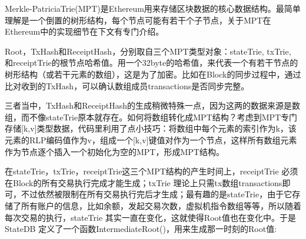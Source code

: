 \documentclass[UTF8]{ctexart}
\begin{document}
Merkle-PatriciaTrie(MPT)是Ethereum用来存储区块数据的核心数据结构。最简单理解是一个倒置的树形结构，每个节点可能有若干个子节点，关于MPT在Ethereum中的实现细节在下文有专门介绍。

Root，TxHash和ReceiptHash，分别取自三个MPT类型对象：stateTrie, txTrie, 和receiptTrie的根节点哈希值。用一个32byte的哈希值，来代表一个有若干节点的树形结构（或若干元素的数组），这是为了加密。比如在Block的同步过程中，通过比对收到的TxHash，可以确认数组成员transactions是否同步完整。

三者当中，TxHash和ReceiptHash的生成稍微特殊一点，因为这两的数据来源是数组，而不像stateTrie原本就存在。如何将数组转化成MPT结构？考虑到MPT专门存储[k,v]类型数据，代码里利用了点小技巧：将数组中每个元素的索引作为k，该元素的RLP编码值作为v，组成一个[k,v]键值对作为一个节点，这样所有数组元素作为节点逐个插入一个初始化为空的MPT，形成MPT结构。

在stateTrie，txTrie，receiptTrie这三个MPT结构的产生时间上，receiptTrie 必须在Block的所有交易执行完成才能生成；txTrie 理论上只需tx数组transactions即可，不过依然被限制在所有交易执行完后才生成；最有趣的是stateTrie，由于它存储了所有账户的信息，比如余额，发起交易次数，虚拟机指令数组等等，所以随着每次交易的执行，stateTrie 其实一直在变化，这就使得Root值也在变化中。于是StateDB 定义了一个函数IntermediateRoot()，用来生成那一时刻的Root值:
\end{document}
